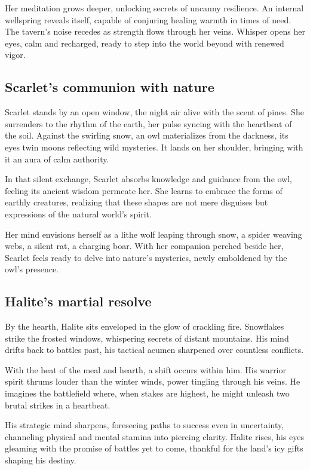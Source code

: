 \documentclass[
  letterpaper,12pt,twoside,twocolumn,openany,
  nodeprecatedcode,bg=full]{dndbook}
\begin{document}
Her meditation grows deeper, unlocking secrets of uncanny resilience. An
internal wellspring reveals itself, capable of conjuring healing warmth
in times of need. The tavern's noise recedes as strength flows through
her veins. Whisper opens her eyes, calm and recharged, ready to step
into the world beyond with renewed vigor.

\subsection{Scarlet's communion with
nature}\label{scarlets-communion-with-nature}

Scarlet stands by an open window, the night air alive with the scent of
pines. She surrenders to the rhythm of the earth, her pulse syncing with
the heartbeat of the soil. Against the swirling snow, an owl
materializes from the darkness, its eyes twin moons reflecting wild
mysteries. It lands on her shoulder, bringing with it an aura of calm
authority.

In that silent exchange, Scarlet absorbs knowledge and guidance from the
owl, feeling its ancient wisdom permeate her. She learns to embrace the
forms of earthly creatures, realizing that these shapes are not mere
disguises but expressions of the natural world's spirit.

Her mind envisions herself as a lithe wolf leaping through snow, a
spider weaving webs, a silent rat, a charging boar. With her companion
perched beside her, Scarlet feels ready to delve into nature's
mysteries, newly emboldened by the owl's presence.

\subsection{Halite's martial resolve}\label{halites-martial-resolve}

By the hearth, Halite sits enveloped in the glow of crackling fire.
Snowflakes strike the frosted windows, whispering secrets of distant
mountains. His mind drifts back to battles past, his tactical acumen
sharpened over countless conflicts.

With the heat of the meal and hearth, a shift occurs within him. His
warrior spirit thrums louder than the winter winds, power tingling
through his veins. He imagines the battlefield where, when stakes are
highest, he might unleash two brutal strikes in a heartbeat.

His strategic mind sharpens, foreseeing paths to success even in
uncertainty, channeling physical and mental stamina into piercing
clarity. Halite rises, his eyes gleaming with the promise of battles yet
to come, thankful for the land's icy gifts shaping his destiny.
\end{document}
